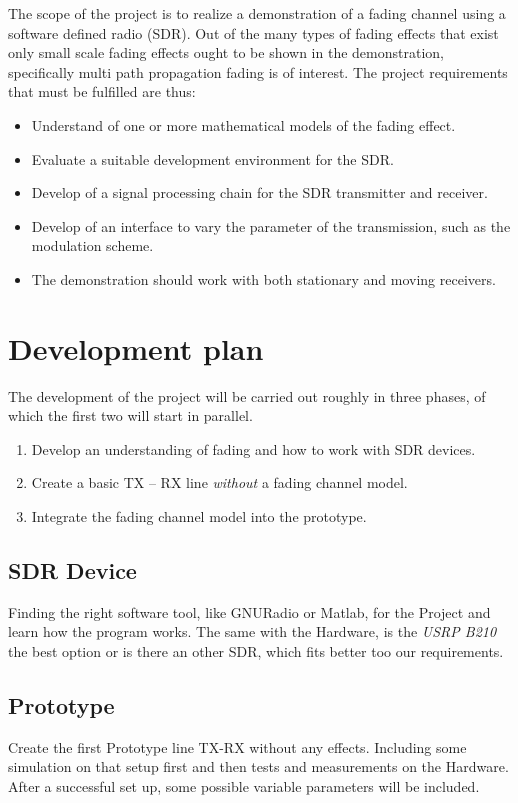\documentclass[a4paper, twosided, 11pt]{scrartcl}
\begin{document}
The scope of the project is to realize a demonstration of a fading channel using a software defined radio (SDR).
Out of the many types of fading effects that exist only small scale fading effects ought to be shown in the demonstration, specifically multi path propagation fading is of interest.
The project requirements that must be fulfilled are thus:
\begin{itemize}
	\item Understand of one or more mathematical models of the fading effect.
	\item Evaluate a suitable development environment for the SDR.
	\item Develop of a signal processing chain for the SDR transmitter and receiver.
	\item Develop of an interface to vary the parameter of the transmission, such as the modulation scheme.
	\item The demonstration should work with both stationary and moving receivers.
\end{itemize}

\section{Development plan}

The development of the project will be carried out roughly in three phases, of which the first two will start in parallel.
\begin{enumerate}
	\item Develop an understanding of fading and how to work with SDR devices.
	\item Create a basic TX -- RX line \emph{without} a fading channel model.
	\item Integrate the fading channel model into the prototype.
\end{enumerate}

\subsection{SDR Device}
Finding the right software tool, like GNURadio or Matlab, for the Project and learn how the program works. The same with the Hardware, is the \textit{USRP B210} the best option or is there an other SDR, which fits better too our requirements. 

\subsection{Prototype}
Create the first Prototype line TX-RX without any effects. Including some simulation on that setup first and then tests and measurements on the Hardware. 
After a successful set up, some possible variable parameters will be included. 
\end{document}

